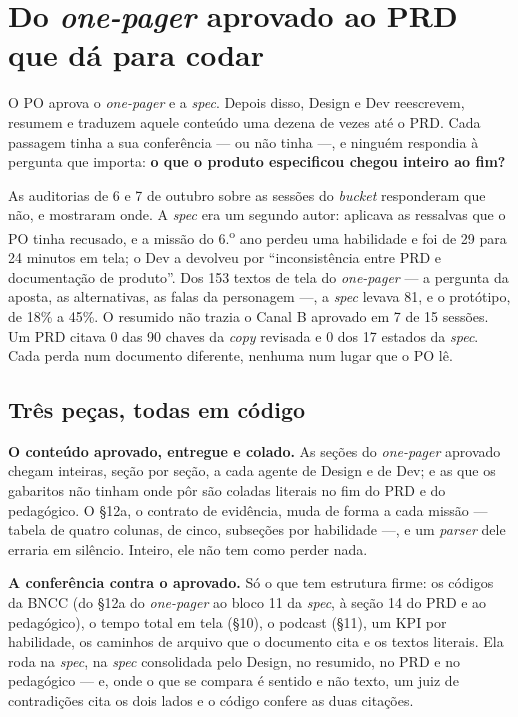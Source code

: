 \documentclass[11pt,a4paper]{article}
\begin{document}
\section{Do \emph{one-pager} aprovado ao PRD que dá para codar}
\label{sec:aprovado}

O PO aprova o \emph{one-pager} e a \emph{spec}. Depois disso, Design e Dev reescrevem, resumem e traduzem aquele conteúdo uma dezena de vezes até o PRD. Cada passagem tinha a sua conferência --- ou não tinha ---, e ninguém respondia à pergunta que importa: \textbf{o que o produto especificou chegou inteiro ao fim?}

As auditorias de 6 e 7 de outubro sobre as sessões do \emph{bucket} responderam que não, e mostraram onde. A \emph{spec} era um segundo autor: aplicava as ressalvas que o PO tinha recusado, e a missão do 6.\textsuperscript{o} ano perdeu uma habilidade e foi de 29 para 24 minutos em tela; o Dev a devolveu por ``inconsistência entre PRD e documentação de produto''. Dos 153 textos de tela do \emph{one-pager} --- a pergunta da aposta, as alternativas, as falas da personagem ---, a \emph{spec} levava 81, e o protótipo, de 18\% a 45\%. O resumido não trazia o Canal B aprovado em 7 de 15 sessões. Um PRD citava 0 das 90 chaves da \emph{copy} revisada e 0 dos 17 estados da \emph{spec}. Cada perda num documento diferente, nenhuma num lugar que o PO lê.

\subsection{Três peças, todas em código}

{\sffamily\bfseries\color{unNavy}O conteúdo aprovado, entregue e colado.} As seções do \emph{one-pager} aprovado chegam inteiras, seção por seção, a cada agente de Design e de Dev; e as que os gabaritos não tinham onde pôr são coladas literais no fim do PRD e do pedagógico. O \S12a, o contrato de evidência, muda de forma a cada missão --- tabela de quatro colunas, de cinco, subseções por habilidade ---, e um \emph{parser} dele erraria em silêncio. Inteiro, ele não tem como perder nada.

{\sffamily\bfseries\color{unNavy}A conferência contra o aprovado.} Só o que tem estrutura firme: os códigos da BNCC (do \S12a do \emph{one-pager} ao bloco 11 da \emph{spec}, à seção 14 do PRD e ao pedagógico), o tempo total em tela (\S10), o podcast (\S11), um KPI por habilidade, os caminhos de arquivo que o documento cita e os textos literais. Ela roda na \emph{spec}, na \emph{spec} consolidada pelo Design, no resumido, no PRD e no pedagógico --- e, onde o que se compara é sentido e não texto, um juiz de contradições cita os dois lados e o código confere as duas citações.
\end{document}
